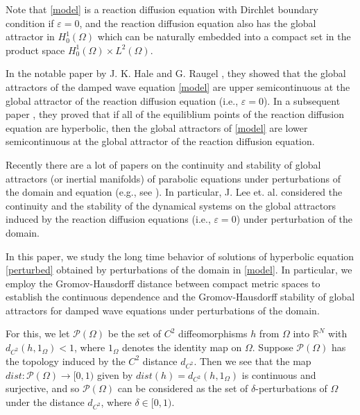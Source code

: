 \documentclass[11pt]{amsart}
\begin{document}
Note that  \eqref{model} is a reaction diffusion equation with Dirchlet boundary condition if $\varepsilon = 0$, and the reaction diffusion
equation also has the global attractor in $H^1_0(\Omega)$ which can be naturally embedded into a compact set in the product space $H^1_0(\Omega) \times L^2(\Omega)$.


In the notable paper by J. K. Hale and G. Raugel  \cite{HR1}, they showed that the global attractors of the damped wave equation \eqref{model} are upper semicontinuous at the global attractor of the reaction diffusion equation (i.e., $\varepsilon=0$).
In a subsequent paper \cite{HR2}, they proved that if all of the equiliblium points of the reaction diffusion equation  are hyperbolic, then 
the global attractors of \eqref{model} are lower semicontinuous at the global attractor of the reaction diffusion equation. 



Recently there are a lot of papers on the continuity and stability of global attractors (or inertial manifolds) of parabolic equations under perturbations of the domain and equation (e.g., see \cite{JK, HR1, HR2, LN, LT, LNP, LNP2, LNT, LP, LP2}). In particular, J. Lee et. al. \cite{LNT} considered the continuity and the stability of the dynamical systems on the global attractors induced by the reaction diffusion equations (i.e., $\varepsilon=0$) under perturbation of the domain.

In this paper, 
we study the long time behavior of solutions of hyperbolic equation \eqref{perturbed} obtained by perturbations of the domain in \eqref{model}. In particular,
we employ the Gromov-Hausdorff distance between compact metric spaces to establish the continuous dependence and the Gromov-Hausdorff stability of global attractors for damped wave equations under perturbations of the domain.

For this, we let $\mathcal P(\Omega)$ be the set of $C^2$ diffeomorphisms $h$ from $\Omega$ into $\mathbb R^N$ with $d_{C^2}(h, 1_{\Omega}) < 1$, where $1_{\Omega}$  denotes the identity map on $\Omega$. 
Suppose  $\mathcal P(\Omega)$  has the topology induced by the $C^2$ distance $d_{C^2}$. Then we see that the map $dist: \mathcal P(\Omega)  \to [0, 1)$  given by $dist(h)= d_{C^2}(h, 1_{\Omega})$ is continuous and surjective, and so $\mathcal P(\Omega)$ can be considered as the set of $\delta$-perturbations of $\Omega$ under the distance $d_{C^2}$, where $\delta \in [0, 1)$.



\end{document}
